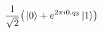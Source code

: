 \documentclass[preview]{standalone}
\begin{document}
\begin{align*}
\frac{1}{\sqrt{2}} \bigr( \ket{0} + e^{2\pi i 0.q_{3} } \ket{1}\bigr)
\end{align*}
\end{document}
